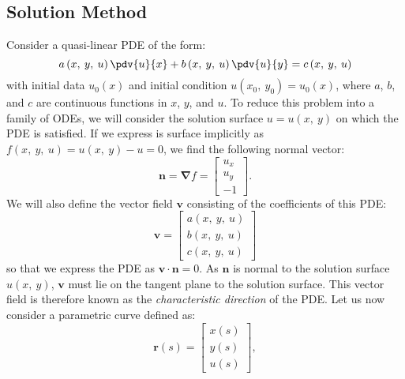 \documentclass{article}
\theoremstyle{definition}
\begin{document}
\subsection{Solution Method}
Consider a quasi-linear PDE of the form:
\begin{equation*}
    a\left( x,\: y,\: u \right) \pdv{u}{x} + b\left( x,\: y,\: u \right) \pdv{u}{y} = c\left( x,\: y,\: u \right)
\end{equation*}
with initial data \(u_0\left( x \right)\) and initial condition
\(u\left( x_0,\: y_0 \right) = u_0\left( x \right)\), where \(a\), \(b\),
and \(c\) are continuous functions in \(x\), \(y\), and \(u\). To reduce
this problem into a family of ODEs, we will consider the solution
surface \(u = u\left( x,\: y \right)\) on which the PDE is satisfied.
If we express is surface implicitly as \(f\left( x,\: y,\: u \right) = u\left( x,\: y \right) - u = 0\),
we find the following normal vector:
\begin{equation*}
    \symbf{n} = \symbf{\nabla} f =
    \begin{bmatrix}
        u_x \\
        u_y \\
        -1
    \end{bmatrix}
    .
\end{equation*}
We will also define the vector field \(\symbf{v}\) consisting of the
coefficients of this PDE:
\begin{equation*}
    \symbf{v} =
    \begin{bmatrix}
        a\left( x,\: y,\: u \right) \\
        b\left( x,\: y,\: u \right) \\
        c\left( x,\: y,\: u \right)
    \end{bmatrix}
\end{equation*}
so that we express the PDE as \(\symbf{v} \cdot \symbf{n} = 0\). As
\(\symbf{n}\) is normal to the solution surface \(u\left( x,\: y \right)\),
\(\symbf{v}\) must lie on the tangent plane to the solution surface.
This vector field is therefore known as the \textit{characteristic
    direction} of the PDE. Let us now consider a parametric curve defined as:
\begin{equation*}
    \symbf{r}\left( s \right) =
    \begin{bmatrix}
        x\left( s \right) \\
        y\left( s \right) \\
        u\left( s \right)
    \end{bmatrix}
    ,
\end{equation*}
\end{document}
